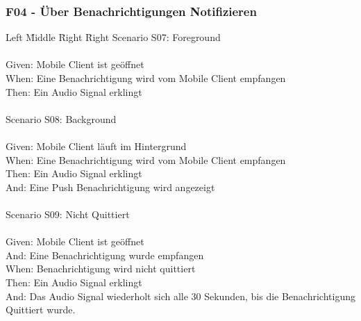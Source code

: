 \subsubsection*{F04 - Über Benachrichtigungen Notifizieren}
\begin{tabbing}
    Left \= Middle \= Right \= Right  \kill
    Scenario S07: \> \> \>  Foreground\\ \\
    Given: \> \> \>   Mobile Client ist geöffnet\\
    When: \> \> \>    Eine Benachrichtigung wird vom Mobile Client empfangen\\
    Then: \> \> \>    Ein Audio Signal erklingt\\
    \\
    Scenario S08: \> \> \>  Background\\ \\
    Given: \> \> \>   Mobile Client läuft im Hintergrund\\
    When: \> \> \>    Eine Benachrichtigung wird vom Mobile Client empfangen\\
    Then: \> \> \>    Ein Audio Signal erklingt\\
    And: \> \> \>     Eine Push Benachrichtigung wird angezeigt\\
    \\
    Scenario S09: \> \> \>  Nicht Quittiert\\ \\
    Given: \> \> \>   Mobile Client ist geöffnet\\
    And: \> \> \>     Eine Benachrichtigung wurde empfangen\\
    When: \> \> \>    Benachrichtigung wird nicht quittiert\\
    Then: \> \> \>    Ein Audio Signal erklingt\\
    And: \> \> \>     Das Audio Signal wiederholt sich alle 30 Sekunden, bis die Benachrichtigung Quittiert wurde.\\
\end{tabbing}

\clearpage

